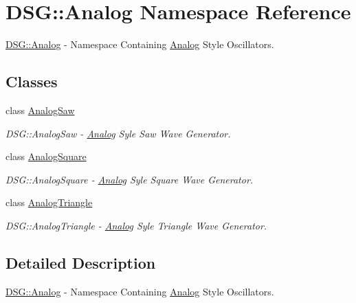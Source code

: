 \hypertarget{namespace_d_s_g_1_1_analog}{\section{D\+S\+G\+:\+:Analog Namespace Reference}
\label{namespace_d_s_g_1_1_analog}
}


\hyperlink{namespace_d_s_g_1_1_analog}{D\+S\+G\+::\+Analog} -\/ Namespace Containing \hyperlink{namespace_d_s_g_1_1_analog}{Analog} Style Oscillators.  


\subsection*{Classes}
\begin{DoxyCompactItemize}
\item 
class \hyperlink{class_d_s_g_1_1_analog_1_1_analog_saw}{Analog\+Saw}
\begin{DoxyCompactList}\small\item\em D\+S\+G\+::\+Analog\+Saw -\/ \hyperlink{namespace_d_s_g_1_1_analog}{Analog} Syle Saw Wave Generator. \end{DoxyCompactList}\item 
class \hyperlink{class_d_s_g_1_1_analog_1_1_analog_square}{Analog\+Square}
\begin{DoxyCompactList}\small\item\em D\+S\+G\+::\+Analog\+Square -\/ \hyperlink{namespace_d_s_g_1_1_analog}{Analog} Syle Square Wave Generator. \end{DoxyCompactList}\item 
class \hyperlink{class_d_s_g_1_1_analog_1_1_analog_triangle}{Analog\+Triangle}
\begin{DoxyCompactList}\small\item\em D\+S\+G\+::\+Analog\+Triangle -\/ \hyperlink{namespace_d_s_g_1_1_analog}{Analog} Syle Triangle Wave Generator. \end{DoxyCompactList}\end{DoxyCompactItemize}


\subsection{Detailed Description}
\hyperlink{namespace_d_s_g_1_1_analog}{D\+S\+G\+::\+Analog} -\/ Namespace Containing \hyperlink{namespace_d_s_g_1_1_analog}{Analog} Style Oscillators. 